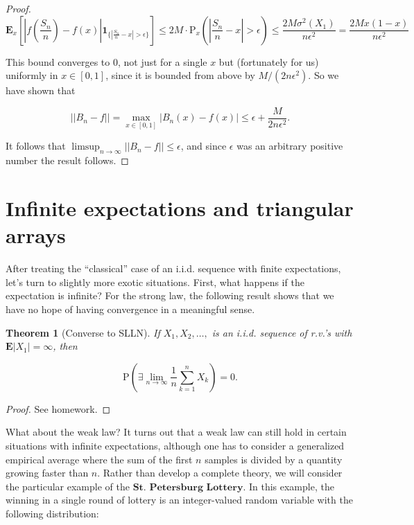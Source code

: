 \documentclass[11pt]{report}
\theoremstyle{plain}
\newtheorem{thm}{Theorem}[chapter]
\theoremstyle{definition}
\begin{document}
\begin{proof}
\[
\mathbf{E}_x \left[\left|f\left(\frac{S_n}{n}\right)-f(x)\right|\mathbf{1}_{\{ \left|\frac{S_n}{n}-x\right|>\epsilon \}} \right]
\le 2M\cdot \mathrm{P}_x\left( \left|\frac{S_n}{n}-x\right|>\epsilon\right)
\le \frac{2 M \sigma^2(X_1)}{n \epsilon^2} = \frac{2 M x(1-x)}{n\epsilon^2}
\]

This bound converges to $0$, not just for a single
$x$ but (fortunately for us) uniformly in $x\in[0,1]$,
since it is bounded from above by $M/(2n\epsilon^2)$.
So we have shown that

\[
||B_n-f|| = \max_{x\in[0,1]} |B_n(x)-f(x)| \le
\epsilon + \frac{M}{2n\epsilon^2}.
\]

It follows that
$\limsup_{n\to\infty} ||B_n-f|| \le \epsilon$, and
since $\epsilon$ was an arbitrary positive number the
result follows.
\end{proof}

\section{Infinite expectations and triangular arrays}
After treating the ``classical'' case of an i.i.d.
sequence with finite expectations, let's turn to
slightly more exotic situations. First, what happens
if the expectation is infinite? For the strong law,
the following result shows that we have no hope of
having convergence in a meaningful sense.

\begin{thm}[Converse to SLLN]
If $X_1,X_2,\ldots,$ is an i.i.d. sequence of r.v.'s
with $\mathbf{E}|X_1|=\infty$, then

\[
\mathrm{P}\left( \exists \lim_{n\to\infty} \frac{1}{n}\sum_{k=1}^n X_k \right) = 0.
\]

\end{thm}

\begin{proof}
See homework.
\end{proof}

What about the weak law? It turns out that a weak law
can still hold in certain situations with infinite
expectations, although one has to consider a
generalized empirical average where the sum of the
first $n$ samples is divided by a quantity growing
faster than $n$. Rather than develop a complete
theory, we will consider the particular example of the
$\textbf{St. Petersburg Lottery}$. In this example,
the winning in a single round of lottery is an
integer-valued random variable with the following
distribution:
\end{document}
